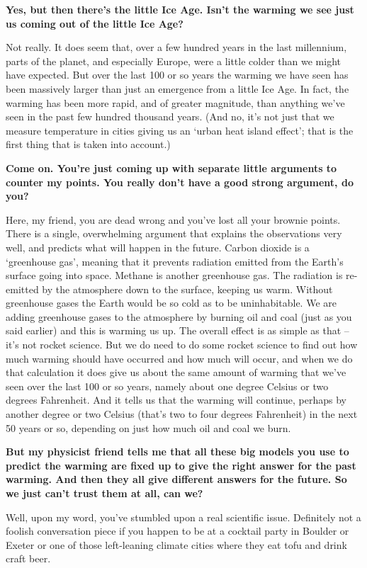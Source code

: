 \documentclass[11pt]{article}
\begin{document}
\textbf{\color{navy} Yes, but then there's the little Ice Age. Isn't the warming we
see just us coming out of the little Ice Age?}

Not really. It does seem that, over a few hundred years in the last
millennium, parts of the planet, and especially Europe, were a little
colder than we might have expected. But over the last 100 or so years
the warming we have seen has been massively larger than just an
emergence from a little Ice Age. In fact, the warming has been more
rapid, and of greater magnitude, than anything we've seen in the past
few hundred thousand years. (And no, it's not just that we measure temperature in
cities giving us an `urban heat island effect'; that is the first thing
that is taken into account.)

\textbf{\color{navy} Come on. You're just coming up with separate little arguments
to counter my points. You really don't have a good strong argument, do
you?}

Here, my friend, you are dead wrong and you've lost all your brownie
points. There is a single, overwhelming argument that explains the
observations very well, and predicts what will happen in the future.
Carbon dioxide is a `greenhouse gas', meaning that it prevents radiation
emitted from the Earth's surface going into space. Methane is another
greenhouse gas. The radiation is re-emitted by the atmosphere down to
the surface, keeping us warm. Without greenhouse gases the Earth would
be so cold as to be uninhabitable. We are adding greenhouse gases to the
atmosphere by burning oil and coal (just as you said earlier) and this
is warming us up. The overall effect is as simple as that -- it's not
rocket science. But we do need to do some rocket science to find out how
much warming should have occurred and how much will occur, and when we
do that calculation it does give us about the same amount of warming
that we've seen over the last 100 or so years, namely about one degree
Celsius or two degrees Fahrenheit. And it tells us that the warming will
continue, perhaps by another degree or two Celsius (that's two to four
degrees Fahrenheit) in the next 50 years or so, depending on just how
much oil and coal we burn.

\textbf{\color{navy} But my physicist friend tells me that all these big models you
use to predict the warming are fixed up to give the right answer for the
past warming. And then they all give different answers for the future.
So we just can't trust them at all, can we?}

Well, upon my word, you've stumbled upon a real scientific issue.
Definitely not a foolish conversation piece if you happen to be at a
cocktail party in Boulder or Exeter or one of those left-leaning climate
cities where they eat tofu and drink craft beer.
\end{document}
